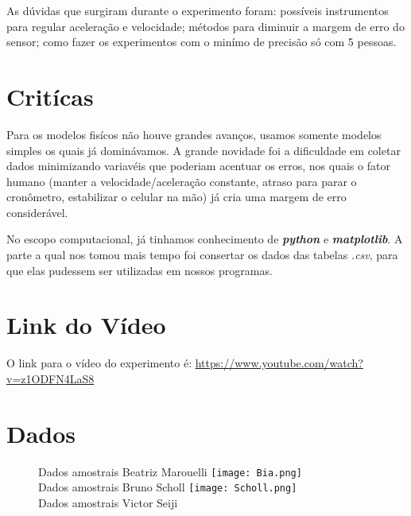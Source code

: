 \documentclass[a4paper, 12pt]{article}
\begin{document}
As dúvidas que surgiram durante o experimento foram: possíveis instrumentos para
regular aceleração e velocidade; métodos para diminuir a margem de erro do
sensor; como fazer os experimentos com o minímo de precisão só com 5 pessoas.

\section*{Critícas}
Para os modelos fisícos não houve grandes avanços, usamos somente modelos
simples os quais já dominávamos. A grande novidade foi a dificuldade em coletar
dados minimizando variavéis que poderiam acentuar os erros, nos quais o fator
humano (manter a velocidade/aceleração constante, atraso para parar o
cronômetro, estabilizar o celular na mão) já cria uma margem de erro considerável. 

No escopo computacional, já tinhamos conhecimento de \textit{\textbf{python}} e
\textit{\textbf{matplotlib}}. A parte a qual nos tomou mais tempo foi consertar
os dados das tabelas \textit{.csv}, para que elas pudessem ser utilizadas em
nossos programas.

\section*{Link do Vídeo}
O link para o vídeo do experimento é:
\url{https://www.youtube.com/watch?v=z1ODFN4LaS8}

\section*{Dados}
    \begin{figure}
    \centering
    Dados amostrais Beatriz Marouelli
    \texttt{[image: Bia.png]}
    \\ Dados amostrais Bruno Scholl
    \texttt{[image: Scholl.png]}
    \\ Dados amostrais Victor Seiji 
    \end{figure}
\end{document}
